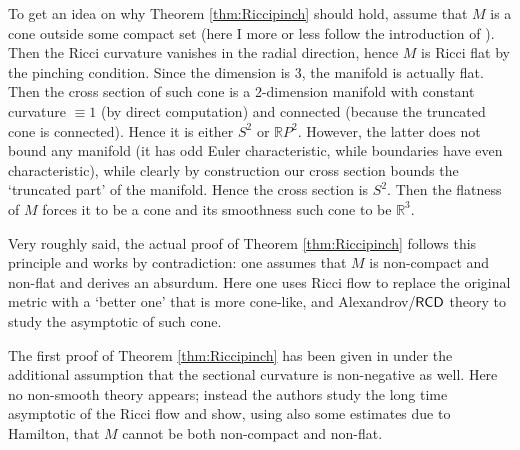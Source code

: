 \documentclass[11pt]{article}
\numberwithin{equation}{section}
\newcommand{\R}{\mathbb{R}}
\newcommand{\RCD}{{\sf RCD}}
\begin{document}
To get an idea on why Theorem \ref{thm:Riccipinch} should hold, assume that $M$ is a cone outside some compact set (here I more or less follow the introduction of \cite{Lott19}). Then the Ricci curvature vanishes in the radial direction, hence $M$ is Ricci flat by the pinching condition. Since the dimension is 3, the manifold is actually flat. Then the cross section of such cone is a 2-dimension manifold with constant curvature $\equiv 1$ (by direct computation) and connected (because the truncated cone is connected). Hence it is either $S^2$ or $\R P^2$. However,  the latter does not bound any manifold (it has odd Euler characteristic, while boundaries have even characteristic), while clearly by construction our cross section bounds the `truncated part' of the manifold. Hence the cross section is $S^2$. Then the flatness of $M$ forces it to be a cone and its smoothness such cone to be $\R^3$.


Very roughly said, the actual proof of Theorem  \ref{thm:Riccipinch} follows this principle and works by contradiction: one assumes that $M$ is non-compact and non-flat and derives an absurdum. Here one uses Ricci flow to replace the original metric with a `better one' that is more cone-like, and Alexandrov/$\RCD$ theory to study the asymptotic of such cone.

\medskip
   
The first proof of Theorem \ref{thm:Riccipinch} has been given  in \cite{CheZhu00} under the additional assumption that the sectional curvature is non-negative as well. Here no non-smooth theory appears; instead the authors study the long time asymptotic of the Ricci flow and show, using also some estimates due to Hamilton, that $M$ cannot be both non-compact and non-flat.
\end{document}
